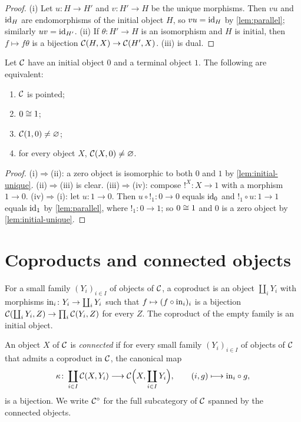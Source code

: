 \begin{proof}
(i) Let $u\colon H\to H'$ and $v\colon H'\to H$ be the unique morphisms. Then
$vu$ and $\mathrm{id}_H$ are endomorphisms of the initial object $H$, so
$vu=\mathrm{id}_H$ by \cref{lem:parallel}; similarly $uv=\mathrm{id}_{H'}$.
(ii) If $\theta\colon H'\to H$ is an isomorphism and $H$ is initial, then
$f\mapsto f\theta$ is a bijection $\mathcal{C}(H,X)\to\mathcal{C}(H',X)$.
(iii) is dual.
\end{proof}

\begin{lemma}\label{lem:pointed}
Let $\mathcal{C}$ have an initial object $0$ and a terminal object $1$. The following
are equivalent:
\begin{enumerate}
\item $\mathcal{C}$ is pointed;
\item $0\cong 1$;
\item $\mathcal{C}(1,0)\neq\varnothing$;
\item for every object $X$, $\mathcal{C}(X,0)\neq\varnothing$.
\end{enumerate}
\end{lemma}

\begin{proof}
(i)$\Rightarrow$(ii): a zero object is isomorphic to both $0$ and $1$ by
\cref{lem:initial-unique}. (ii)$\Rightarrow$(iii) is clear.
(iii)$\Rightarrow$(iv): compose $!^X\colon X\to 1$ with a morphism $1\to 0$.
(iv)$\Rightarrow$(i): let $u\colon 1\to 0$. Then $u\circ{!_1}\colon 0\to 0$
equals $\mathrm{id}_0$ and ${!_1}\circ u\colon 1\to 1$ equals $\mathrm{id}_1$ by
\cref{lem:parallel}, where ${!_1}\colon 0\to 1$; so $0\cong 1$ and $0$ is a
zero object by \cref{lem:initial-unique}.
\end{proof}

\section{Coproducts and connected objects}\label{sec:connected}

For a small family $(Y_i)_{i\in I}$ of objects of $\mathcal{C}$, a coproduct is an
object $\coprod_i Y_i$ with morphisms $\mathrm{in}_i\colon Y_i\to\coprod_iY_i$ such
that $f\mapsto (f\circ\mathrm{in}_i)_i$ is a bijection
$\mathcal{C}(\coprod_iY_i,Z)\to\prod_i\mathcal{C}(Y_i,Z)$ for every $Z$. The coproduct of the
empty family is an initial object.

\begin{definition}\label{def:connected}
An object $X$ of $\mathcal{C}$ is \emph{connected} if for every small family
$(Y_i)_{i\in I}$ of objects of $\mathcal{C}$ that admits a coproduct in $\mathcal{C}$, the
canonical map
\begin{equation}\label{eq:connected}
\kappa\colon \coprod_{i\in I}\mathcal{C}(X,Y_i)\longrightarrow\mathcal{C}\Bigl(X,\coprod_{i\in I}Y_i\Bigr),\qquad (i,g)\longmapsto \mathrm{in}_i\circ g,
\end{equation}
is a bijection. We write $\mathcal{C}^{\circ}$ for the full subcategory of $\mathcal{C}$
spanned by the connected objects.
\end{definition}

